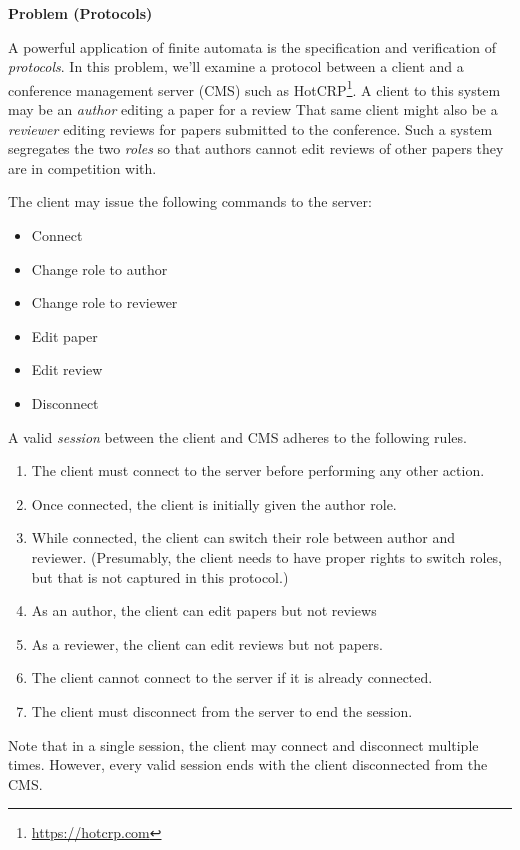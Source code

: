 \documentclass[12pt]{article}
\newcounter{ProblemCounter}
\newenvironment{problem}[1][]
  {\refstepcounter{ProblemCounter}\noindent\textbf{Problem \theProblemCounter{} (#1)}\quad}
  {\newpage}
\begin{document}

\begin{problem}[Protocols]

A powerful application of finite automata is the specification and
verification of \emph{protocols}.  In this problem, we'll examine a protocol
between a client and a conference management server (CMS) such as
HotCRP\footnote{%
  \url{https://hotcrp.com}
}.
A client to this system may be an \emph{author} editing a paper for a review
That same client might also be a \emph{reviewer} editing reviews for papers
submitted to the conference.  Such a system segregates the two \emph{roles} so
that authors cannot edit reviews of other papers they are in competition with.

The client may issue the following commands to the server:
\begin{itemize}[itemsep=0pt]
  \item Connect
  \item Change role to author
  \item Change role to reviewer
  \item Edit paper
  \item Edit review
  \item Disconnect
\end{itemize}
A valid \emph{session} between the client and CMS adheres to the following
rules.
\begin{enumerate}[itemsep=0pt]
  \item The client must connect to the server before performing any other
    action.
  \item Once connected, the client is initially given the author role.
  \item While connected, the client can switch their role between author
    and reviewer.  (Presumably, the client needs to have proper rights to
    switch roles, but that is not captured in this protocol.)
  \item As an author, the client can edit papers but not reviews
  \item As a reviewer, the client can edit reviews but not papers.
  \item The client cannot connect to the server if it is already connected.
  \item The client must disconnect from the server to end the session.
\end{enumerate}
Note that in a single session, the client may connect and disconnect multiple
times.  However, every valid session ends with the client disconnected from the
CMS.


\end{problem}
\end{document}
